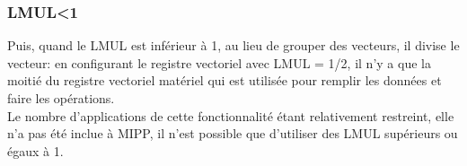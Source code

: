 \subsubsection{LMUL<1}

Puis, quand le LMUL est inférieur à 1, au lieu de grouper des vecteurs, il divise le vecteur: en configurant le registre vectoriel avec LMUL = 1/2, il n'y a que la moitié du registre vectoriel matériel qui est utilisée pour remplir les données et faire les opérations.\\

Le nombre d'applications de cette fonctionnalité étant relativement restreint, elle n'a pas été inclue à MIPP, il n'est possible que d'utiliser des LMUL supérieurs ou égaux à 1.